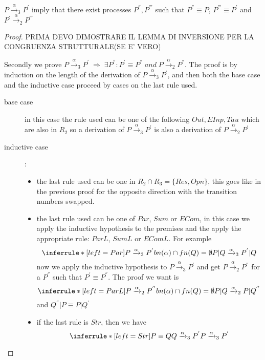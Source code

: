 \begin{theorem}
  $P\xrightarrow{\alpha}_{3}P^{'}$ imply that there exist processes $P^{''}, P^{'''}$ such that $P^{''}\equiv P$, $P^{'''}\equiv P^{'}$  and $P^{'}\xrightarrow{\alpha}_{2}P^{'''}$
  \begin{proof}
	PRIMA DEVO DIMOSTRARE IL LEMMA DI INVERSIONE PER LA CONGRUENZA STRUTTURALE(SE E' VERO)

	Secondly we prove $P\xrightarrow{\alpha}_{3}P^{'}\; \Rightarrow\; \exists P^{''}: P^{'}\equiv P^{''}\; and\; P\xrightarrow{\alpha}_{2}P^{''}$. The proof is by induction on the length of the derivation of $P\xrightarrow{\alpha}_{3}P^{'}$, and then both the base case and the inductive case proceed by cases on the last rule used.
	\begin{description}
	  \item[base case]
	    in this case the rule used can be one of the following $Out, EInp, Tau$ which are also in $R_{2}$ so a derivation of $P\xrightarrow{\alpha}_{3}P^{'}$ is also a derivation of $P\xrightarrow{\alpha}_{2}P^{'}$
	  \item[inductive case]:
	    \begin{itemize}
	      \item 
		the last rule used can be one in $R_{2}\cap R_{3}=\{Res, Opn\}$, this goes like in the previous proof for the opposite direction with the transition numbers swapped.
	      \item
		the last rule used can be one of $Par$, $Sum$ or $ECom$, in this case we apply the inductive hypothesis to the premises and the apply the appropriate rule: $ParL$, $SumL$ or $EComL$. For example
		\[
		  \inferrule* [left=Par]{
		      P\xrightarrow{\alpha}_{3}P^{'}
		    \\
		      bn(\alpha)\cap fn(Q)=\emptyset
		  }{
		      P|Q\xrightarrow{\alpha}_{3}P^{'}|Q
		  }
		\]	
		now we apply the inductive hypothesis to $P\xrightarrow{\alpha}_{3}P^{'}$ and get $P\xrightarrow{\alpha}_{2}P^{''}$ for a $P^{''}$ such that $P^{'}\equiv P^{''}$. The proof we want is
		\[
		      \inferrule* [left=ParL]{
			  P\xrightarrow{\alpha}_{2}P^{''}
			\\
			  bn(\alpha)\cap fn(Q)=\emptyset
		      }{
			  P|Q\xrightarrow{\alpha}_{2}P|Q^{''}
		      }
		\]
		and $Q^{''}|P\equiv P|Q^{'}$
	      \item
		if the last rule is $Str$, then we have
		\[
		  \inferrule* [left=Str]{
		      P\equiv Q
		    \\
		      Q\xrightarrow{\alpha}_{3}P^{'}
		  }{
		    P\xrightarrow{\alpha}_{3}P^{'}
}\]
\end{itemize}
\end{description}
\end{proof}
\end{theorem}
